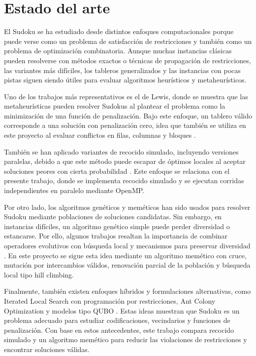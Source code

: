 \documentclass{article}
\begin{document}
\section{Estado del arte}

El Sudoku se ha estudiado desde distintos enfoques computacionales porque puede verse como un problema de satisfacción de restricciones y también como un problema de optimización combinatoria. Aunque muchas instancias clásicas pueden resolverse con métodos exactos o técnicas de propagación de restricciones, las variantes más difíciles, los tableros generalizados y las instancias con pocas pistas siguen siendo útiles para evaluar algoritmos heurísticos y metaheurísticos.

Uno de los trabajos más representativos es el de Lewis, donde se muestra que las metaheurísticas pueden resolver Sudokus al plantear el problema como la minimización de una función de penalización. Bajo este enfoque, un tablero válido corresponde a una solución con penalización cero, idea que también se utiliza en este proyecto al evaluar conflictos en filas, columnas y bloques \cite{lewis2007metaheuristics}.

También se han aplicado variantes de recocido simulado, incluyendo versiones paralelas, debido a que este método puede escapar de óptimos locales al aceptar soluciones peores con cierta probabilidad \cite{karimi2010parallel}. Este enfoque se relaciona con el presente trabajo, donde se implementa recocido simulado y se ejecutan corridas independientes en paralelo mediante OpenMP.

Por otro lado, los algoritmos genéticos y meméticos han sido usados para resolver Sudoku mediante poblaciones de soluciones candidatas. Sin embargo, en instancias difíciles, un algoritmo genético simple puede perder diversidad o estancarse. Por ello, algunos trabajos resaltan la importancia de combinar operadores evolutivos con búsqueda local y mecanismos para preservar diversidad \cite{segura2016diversity}. En este proyecto se sigue esta idea mediante un algoritmo memético con cruce, mutación por intercambios válidos, renovación parcial de la población y búsqueda local tipo hill climbing.

Finalmente, también existen enfoques híbridos y formulaciones alternativas, como Iterated Local Search con programación por restricciones, Ant Colony Optimization y modelos tipo QUBO \cite{musliu2017hybrid,lloyd2019aco,zhao2025quantum}. Estas ideas muestran que Sudoku es un problema adecuado para estudiar codificaciones, vecindarios y funciones de penalización. Con base en estos antecedentes, este trabajo compara recocido simulado y un algoritmo memético para reducir las violaciones de restricciones y encontrar soluciones válidas.\\
\uline{\hfill \phantom{-} \hfill}
\end{document}
